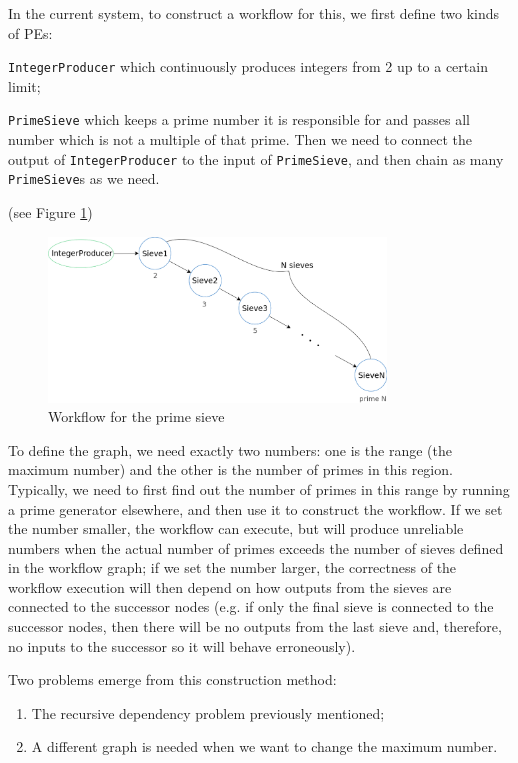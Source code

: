 \newcommand{\cdIntGen}{\lstinline|IntegerProducer|\xspace}
\newcommand{\cdSieve}{\lstinline|PrimeSieve|\xspace}

In the current \dpy system, to construct a workflow for this, we first define two kinds of PEs:
\begin{enumerate*}
	\item \cdIntGen which continuously produces integers from 2 up to a certain limit;
	\item \cdSieve which keeps a prime number it is responsible for and passes all number which is not a multiple of that prime. Then we need to connect the output of \cdIntGen to the input of \cdSieve , and then chain as many \cdSieve{}s as we need.
\end{enumerate*} (see Figure \ref{fig:sieve_static})

\begin{figure}[h]\centering
    \includegraphics[width=0.8\textwidth]{figures/sieve_static}
	\caption{Workflow for the prime sieve}	\label{fig:sieve_static}
\end{figure}

To define the graph, we need exactly two numbers: one is the range (\ie the maximum number) and the other is the number of primes in this region. Typically, we need to first find out the number of primes in this range by running a prime generator elsewhere, and then use it to construct the workflow. If we set the number smaller, the workflow can execute, but will produce unreliable numbers when the actual number of primes exceeds the number of sieves defined in the workflow graph; if we set the number larger, the correctness of the workflow execution will then depend on how outputs from the sieves are connected to the successor nodes (e.g. if only the final sieve is connected to the successor nodes, then there will be no outputs from the last sieve and, therefore, no inputs to the successor so it will behave erroneously).

Two problems emerge from this construction method:
\begin{enumerate}
	\item The recursive dependency problem previously mentioned;
	\item A different graph is needed when we want to change the maximum number.
\end{enumerate}

